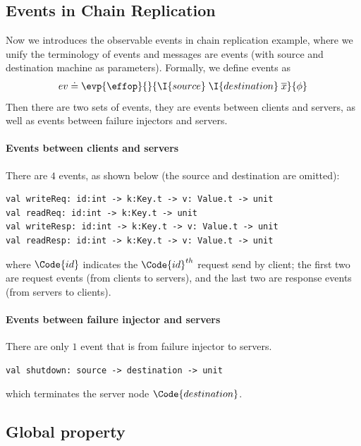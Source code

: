 \subsection{Events in Chain Replication}

Now we introduces the observable events in chain replication example, where we unify the terminology of events and messages are events (with source and destination machine as parameters). Formally, we define events as
\begin{align*}
    ev \doteq \evp{\effop}{}{\I{source}\;\I{destination}\;\overline{x}}{\phi} 
\end{align*}\noindent
Then there are two sets of events, they are events between clients and servers, as well as events between failure injectors and servers.

\paragraph{Events between clients and servers} There are $4$ events, as shown below (the source and destination are omitted):
\begin{verbatim}
val writeReq: id:int -> k:Key.t -> v: Value.t -> unit
val readReq: id:int -> k:Key.t -> unit
val writeResp: id:int -> k:Key.t -> v: Value.t -> unit
val readResp: id:int -> k:Key.t -> v: Value.t -> unit
\end{verbatim}

where $\Code{id}$ indicates the $\Code{id}^{th}$ request send by client; the first two are request events (from clients to servers), and the last two are response events (from servers to clients).

\paragraph{Events between failure injector and servers} There are only $1$ event that is from failure injector to servers.
\begin{verbatim}
val shutdown: source -> destination -> unit
\end{verbatim}

which terminates the server node $\Code{destination}$.

\subsection{Global property}

